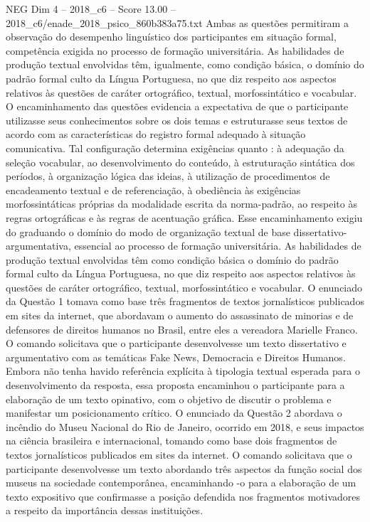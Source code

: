 \begin{textsample}{NEG Dim 4 – 2018\_c6 – Score 13.00 – 2018\_c6/enade\_2018\_psico\_860b383a75.txt}
Ambas as questões permitiram a observação do desempenho linguístico dos participantes em situação formal, competência exigida no processo de formação universitária.
As habilidades de produção textual envolvidas têm, igualmente, como condição básica, o domínio do padrão formal culto da Língua Portuguesa, no que diz respeito aos aspectos relativos às questões de caráter ortográfico, textual, morfossintático e vocabular.
O encaminhamento das questões evidencia a expectativa de que o participante utilizasse seus conhecimentos sobre os dois temas e estruturasse seus textos de acordo com as características do registro formal adequado à situação comunicativa.
Tal configuração determina exigências quanto : à adequação da seleção vocabular, ao desenvolvimento do conteúdo, à estruturação sintática dos períodos, à organização lógica das ideias, à utilização de procedimentos de encadeamento textual e de referenciação, à obediência às exigências morfossintáticas próprias da modalidade escrita da norma-padrão, ao respeito às regras ortográficas e às regras de acentuação gráfica.
Esse encaminhamento exigiu do graduando o domínio do modo de organização textual de base dissertativo-argumentativa, essencial ao processo de formação universitária.
As habilidades de produção textual envolvidas têm como condição básica o domínio do padrão formal culto da Língua Portuguesa, no que diz respeito aos aspectos relativos às questões de caráter ortográfico, textual, morfossintático e vocabular.
O enunciado da Questão 1 tomava como base três fragmentos de textos jornalísticos publicados em sites da internet, que abordavam o aumento do assassinato de minorias e de defensores de direitos humanos no Brasil, entre eles a vereadora Marielle Franco.
O comando solicitava que o participante desenvolvesse um texto dissertativo e argumentativo com as temáticas Fake News, Democracia e Direitos Humanos.
Embora não tenha havido referência explícita à tipologia textual esperada para o desenvolvimento da resposta, essa proposta encaminhou o participante para a elaboração de um texto opinativo, com o objetivo de discutir o problema e manifestar um posicionamento crítico.
O enunciado da Questão 2 abordava o incêndio do Museu Nacional do Rio de Janeiro, ocorrido em 2018, e seus impactos na ciência brasileira e internacional, tomando como base dois fragmentos de textos jornalísticos publicados em sites da internet.
O comando solicitava que o participante desenvolvesse um texto abordando três aspectos da função social dos museus na sociedade contemporânea, encaminhando -o para a elaboração de um texto expositivo que confirmasse a posição defendida nos fragmentos motivadores a respeito da importância dessas instituições.

\end{textsample}
